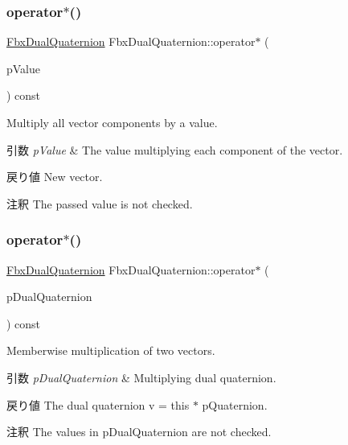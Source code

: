 \subsubsection{\texorpdfstring{operator$\ast$()}{operator*()}\hspace{0.1cm}{\footnotesize\ttfamily [1/3]}}
{\footnotesize\ttfamily \hyperlink{class_fbx_dual_quaternion}{Fbx\+Dual\+Quaternion} Fbx\+Dual\+Quaternion\+::operator$\ast$ (\begin{DoxyParamCaption}\item[{double}]{p\+Value }\end{DoxyParamCaption}) const}

Multiply all vector components by a value. 
\begin{DoxyParams}{引数}
{\em p\+Value} & The value multiplying each component of the vector. \\
\hline
\end{DoxyParams}
\begin{DoxyReturn}{戻り値}
New vector. 
\end{DoxyReturn}
\begin{DoxyRemark}{注釈}
The passed value is not checked. 
\end{DoxyRemark}
\mbox{\label{class_fbx_dual_quaternion_a232075a06a5afe2bdbdcb71611cd08de}} 
\subsubsection{\texorpdfstring{operator$\ast$()}{operator*()}\hspace{0.1cm}{\footnotesize\ttfamily [2/3]}}
{\footnotesize\ttfamily \hyperlink{class_fbx_dual_quaternion}{Fbx\+Dual\+Quaternion} Fbx\+Dual\+Quaternion\+::operator$\ast$ (\begin{DoxyParamCaption}\item[{const \hyperlink{class_fbx_dual_quaternion}{Fbx\+Dual\+Quaternion} \&}]{p\+Dual\+Quaternion }\end{DoxyParamCaption}) const}

Memberwise multiplication of two vectors. 
\begin{DoxyParams}{引数}
{\em p\+Dual\+Quaternion} & Multiplying dual quaternion. \\
\hline
\end{DoxyParams}
\begin{DoxyReturn}{戻り値}
The dual quaternion v\textquotesingle{} = this $\ast$ p\+Quaternion. 
\end{DoxyReturn}
\begin{DoxyRemark}{注釈}
The values in p\+Dual\+Quaternion are not checked. 
\end{DoxyRemark}
\mbox{\label{class_fbx_dual_quaternion_aa654ff2e0a7e803ece4ef9267af05dc5}} 
